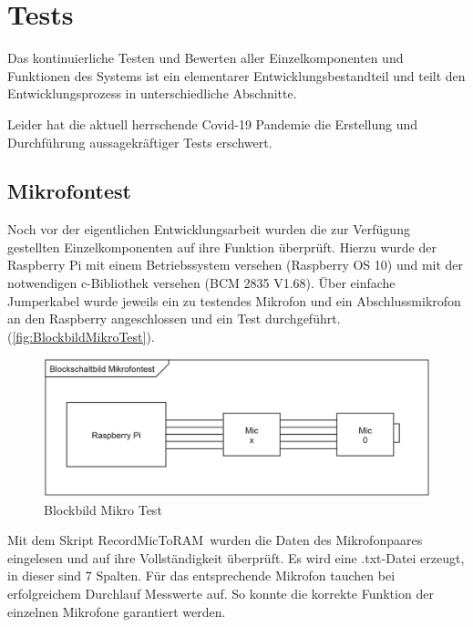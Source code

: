 \section{Tests}

Das kontinuierliche Testen und Bewerten aller Einzelkomponenten und Funktionen des Systems ist ein elementarer Entwicklungsbestandteil und teilt den Entwicklungsprozess in unterschiedliche Abschnitte.

Leider hat die aktuell herrschende Covid-19 Pandemie die Erstellung und Durchführung aussagekräftiger Tests erschwert. 

\subsection{Mikrofontest}

Noch vor der eigentlichen Entwicklungsarbeit wurden die zur Verfügung gestellten Einzelkomponenten auf ihre Funktion überprüft. Hierzu wurde der Raspberry Pi mit einem Betriebssystem versehen (Raspberry OS 10) und mit der notwendigen c-Bibliothek versehen (BCM 2835 V1.68). Über einfache Jumperkabel wurde jeweils ein zu testendes Mikrofon und ein Abschlussmikrofon an den Raspberry angeschlossen und ein Test durchgeführt. (\autoref{fig:BlockbildMikroTest}).

\begin{figure}[h]
	\begin{center}
		\includegraphics[scale=0.1]{Sections/Tests/BlockbildMikroTest}
	\end{center}
	\caption{Blockbild Mikro Test}
	\label{fig:BlockbildMikroTest}
\end{figure}

Mit dem Skript \glqq RecordMicToRAM\grqq\ wurden die Daten des Mikrofonpaares eingelesen und auf ihre Vollständigkeit überprüft. Es wird eine .txt-Datei erzeugt, in dieser sind 7 Spalten. Für das entsprechende Mikrofon tauchen bei erfolgreichem Durchlauf Messwerte auf. So konnte die korrekte Funktion der einzelnen Mikrofone garantiert werden.

